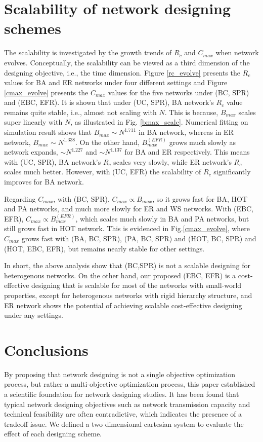 \documentclass[journal]{IEEEtran}
\begin{document}
{\section{Scalability of network designing
schemes}\label{scalability} The scalability is investigated by the
growth trends of $R_c$ and $C_{max}$ when network evolves.
Conceptually, the scalability can be viewed as a third dimension of
the designing objective, i.e., the time dimension. Figure
\ref{rc_evolve} presents the $R_c$ values for BA and ER networks
under four different settings and Figure \ref{cmax_evolve} presents
the $C_{max}$ values for the five networks under (BC, SPR) and (EBC,
EFR). It is shown that under (UC, SPR), BA network's $R_c$ value
remains quite stable, i.e., almost not scaling with $N$. This is
because, $B_{max}$ scales super linearly with $N$, as illustrated in
Fig. \ref{bmax_scale}. Numerical fitting on simulation result shows
that $B_{max}\sim N^{1.711}$ in BA network, whereas in ER network,
$B_{max}\sim N^{1.338}$. On the other hand, $B^{(EFR)}_{max}$ grows
much slowly as network expands, $\sim N^{1.227}$ and $\sim
N^{1.137}$ for BA and ER respectively. This means with (UC, SPR), BA
network's $R_c$ scales very slowly, while ER network's $R_c$ scales
much better. However, with (UC, EFR) the scalability of $R_c$
significantly improves for BA network.

Regarding $C_{max}$, with (BC, SPR), $C_{max}\propto B_{max}$, so it
grows fast for BA, HOT and PA networks, and much more slowly for ER
and WS networks. With (EBC, EFR), $C_{max}\propto B^{(EFR)}_{max}$,
which scales much slowly in BA and PA networks, but still grows fast
in HOT network. This is evidenced in Fig.\ref{cmax_evolve}, where
$C_{max}$ grows fast with (BA, BC, SPR), (PA, BC, SPR) and (HOT, BC,
SPR) and (HOT, EBC, EFR), but remains nearly stable for other
settings.

In short, the above analysis show that (BC,SPR) is not a scalable
designing for heterogenous networks. On the other hand, our proposed
(EBC, EFR) is a cost-effective designing that is scalable for most
of the networks with small-world properties, except for heterogenous
networks with rigid hierarchy structure, and ER network shows the
potential of achieving scalable cost-effective designing under any
settings.


 \section{Conclusions}\label{conclusion}
By proposing that network designing is not a single objective
optimization process, but rather a multi-objective optimization
process, this paper established a scientific foundation for network
designing studies. It has been found that typical network designing
objectives such as network transmission capacity and technical
feasibility are often contradictive, which indicates the presence of
a tradeoff issue. We defined a two dimensional cartesian system to
evaluate the effect of each designing scheme.

}
\end{document}
